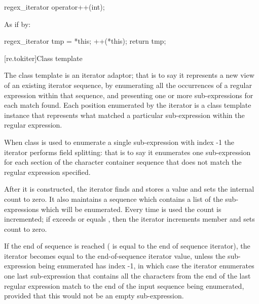 %
\begin{itemdecl}
regex_iterator operator++(int);
\end{itemdecl}

\begin{itemdescr}
\pnum
\effects
As if by:
\begin{codeblock}
regex_iterator tmp = *this;
++(*this);
return tmp;
\end{codeblock}
\end{itemdescr}

[re.tokiter]{Class template }

\pnum
{}%
The class template  is an iterator adaptor; that
is to say it represents a new view of an existing iterator sequence,
by enumerating all the occurrences of a regular expression within that
sequence, and presenting one or more sub-expressions for each match
found. Each position enumerated by the iterator is a  class
template instance that represents what matched a particular sub-expression
within the regular expression.

\pnum
When class  is used to enumerate a
single sub-expression with index -1 the iterator performs field
splitting: that is to say it enumerates one sub-expression for each section of
the character container sequence that does not match the regular
expression specified.

\pnum
{}%
After it is constructed, the iterator finds and stores a value
and sets the internal count  to zero. It also maintains a sequence
 which contains a list of the sub-expressions which will be
enumerated. Every time  is used
the count  is incremented; if  exceeds or equals ,
then the iterator increments member 
and sets count  to zero.

\pnum
{}%
If the end of sequence is reached ( is equal to the end of
sequence iterator), the iterator becomes equal to the end-of-sequence
iterator value, unless the sub-expression being enumerated has index -1,
in which case the iterator enumerates one last sub-expression that contains
all the characters from the end of the last regular expression match to the
end of the input sequence being enumerated, provided that this would not be an
empty sub-expression.

